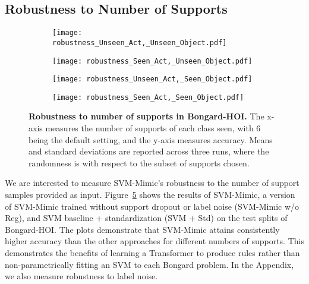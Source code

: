 \subsection{Robustness to Number of Supports}

\begin{figure}
  \centering
  
\begin{subfigure}{0.49\columnwidth}
    \centering
    \texttt{[image: robustness\_Unseen\_Act,\_Unseen\_Object.pdf]}
    \label{fig:sub1}
  \end{subfigure}
  \hfill
  \begin{subfigure}{0.49\columnwidth}
    \centering
    \texttt{[image: robustness\_Seen\_Act,\_Unseen\_Object.pdf]}
    \label{fig:sub2}
  \end{subfigure}
  
\begin{subfigure}{0.49\columnwidth}
    \centering
    \texttt{[image: robustness\_Unseen\_Act,\_Seen\_Object.pdf]}
    \label{fig:sub3}
  \end{subfigure}
  \hfill
  \begin{subfigure}{0.49\columnwidth}
    \centering
    \texttt{[image: robustness\_Seen\_Act,\_Seen\_Object.pdf]}
    \label{fig:sub4}
  \end{subfigure}
  
  \caption{\textbf{Robustness to number of supports in Bongard-HOI.} The x-axis measures the number of supports of each class seen, with 6 being the default setting, and the y-axis measures accuracy. Means and standard deviations are reported across three runs, where the randomness is with respect to the subset of supports chosen.}
  \label{fig:robustness}

\end{figure}

We are interested to measure SVM-Mimic's robustness to the number of support samples provided as input. 
Figure~\ref{fig:robustness} shows the results of SVM-Mimic, a version of SVM-Mimic trained without support dropout or label noise (SVM-Mimic w/o Reg), and SVM baseline + standardization (SVM + Std) on the test splits of Bongard-HOI. The plots demonstrate that SVM-Mimic attains consistently higher accuracy than the other approaches for different numbers of supports.
This demonstrates the benefits of learning a Transformer to produce rules rather than non-parametrically fitting an SVM to each Bongard problem. In the Appendix, we also measure robustness to label noise.

